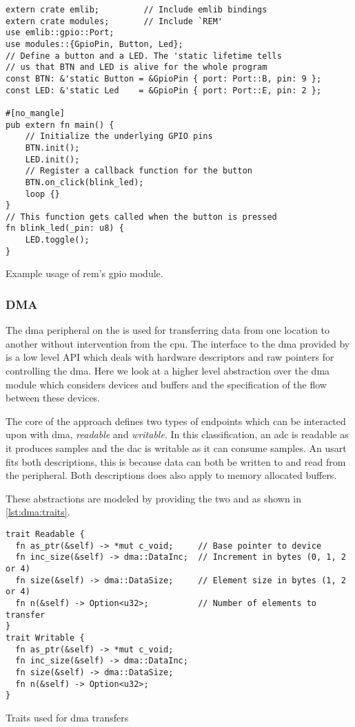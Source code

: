 \begin{listing}[H]
  \begin{verbatim}
extern crate emlib;         // Include emlib bindings
extern crate modules;       // Include `REM'
use emlib::gpio::Port;
use modules::{GpioPin, Button, Led};
// Define a button and a LED. The 'static lifetime tells
// us that BTN and LED is alive for the whole program
const BTN: &'static Button = &GpioPin { port: Port::B, pin: 9 };
const LED: &'static Led    = &GpioPin { port: Port::E, pin: 2 };

#[no_mangle]
pub extern fn main() {
    // Initialize the underlying GPIO pins
    BTN.init();
    LED.init();
    // Register a callback function for the button
    BTN.on_click(blink_led);
    loop {}
}
// This function gets called when the button is pressed
fn blink_led(_pin: u8) {
    LED.toggle();
}
  \end{verbatim}
  \caption{Example usage of \gls{rem}'s \gls{gpio} module.}
  \label{lst:gpio_abstraction}
\end{listing}

\subsubsection{DMA}

The \gls{dma} peripheral on the {\gecko} is used for transferring data from one location to another without intervention from the \gls{cpu}.
The interface to the \gls{dma} provided by {\emlib} is a low level API which deals with hardware descriptors and raw pointers for controlling the \gls{dma}.
Here we look at a higher level abstraction over the \gls{dma} module which considers devices and buffers and the specification of the flow between these devices.

The core of the approach defines two types of endpoints which can be interacted upon with \gls{dma}, \emph{readable} and \emph{writable}.
In this classification, an \gls{adc} is readable as it produces samples and the \gls{dac} is writable as it can consume samples.
An \gls{usart} fits both descriptions, this is because data can both be written to and read from the peripheral.
Both descriptions does also apply to memory allocated buffers.

These abstractions are modeled by providing the two   and  as shown in \autoref{lst:dma:traits}.

\begin{listing}[H]
  \begin{verbatim}
trait Readable {
  fn as_ptr(&self) -> *mut c_void;     // Base pointer to device
  fn inc_size(&self) -> dma::DataInc;  // Increment in bytes (0, 1, 2 or 4)
  fn size(&self) -> dma::DataSize;     // Element size in bytes (1, 2 or 4)
  fn n(&self) -> Option<u32>;          // Number of elements to transfer
}
trait Writable {
  fn as_ptr(&self) -> *mut c_void;
  fn inc_size(&self) -> dma::DataInc;
  fn size(&self) -> dma::DataSize;
  fn n(&self) -> Option<u32>;
}
  \end{verbatim}
  \caption{Traits used for \gls{dma} transfers}
  \label{lst:dma:traits}
\end{listing}

